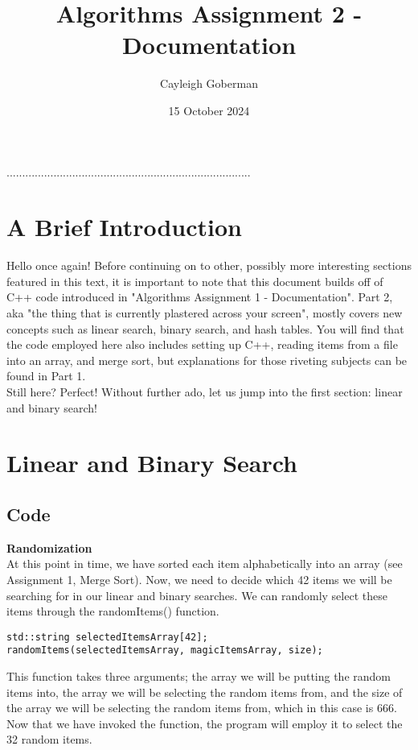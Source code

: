 \documentclass{article}
\title{Algorithms Assignment 2 - Documentation}
\author{Cayleigh Goberman}
\date{15 October 2024}
\begin{document}
\maketitle

\begin{center}
..............................................................................
\end{center}

\tableofcontents

\pagebreak
\section{A Brief Introduction}
Hello once again! Before continuing on to other, possibly more interesting sections featured in this text, it is important to note that this document builds off of C++ code introduced in "Algorithms Assignment 1 - Documentation". Part 2, aka "the thing that is currently plastered across your screen", mostly covers new concepts such as linear search, binary search, and hash tables. You will find that the code employed here also includes setting up C++, reading items from a file into an array, and merge sort, but explanations for those riveting subjects can be found in Part 1. \\
Still here? Perfect! Without further ado, let us jump into the first section: linear and binary search!

\pagebreak
\section{Linear and Binary Search}

\subsection{Code}
\textbf{Randomization} \\
At this point in time, we have sorted each item alphabetically into an array (see Assignment 1, Merge Sort). Now, we need to decide which 42 items we will be searching for in our linear and binary searches. We can randomly select these items through the randomItems() function.

\begin{lstlisting}
std::string selectedItemsArray[42];
randomItems(selectedItemsArray, magicItemsArray, size);
\end{lstlisting}

This function takes three arguments; the array we will be putting the random items into, the array we will be selecting the random items from, and the size of the array we will be selecting the random items from, which in this case is 666. \\
Now that we have invoked the function, the program will employ it to select the 32 random items.
\end{document}
